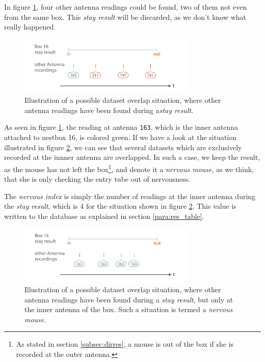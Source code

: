In figure \ref{fig:dataset_overlap}, four other antenna readings could be found, two of them not even from the same box. This \textit{stay result} will be discarded, as we don't know what really happened.

\begin{figure}[htpb]
\begin{center}
  \includegraphics[width=0.75\textwidth]{assets/pdf/dataset_overlap_schema.pdf}
  \caption[Dataset overlap situation]{Illustration of a possible dataset overlap situation, where other antenna readings have been found during a\textit{stay result}.}
  \label{fig:dataset_overlap}
\end{center}
\end{figure}

As seen in figure \ref{fig:dataset_overlap}, the reading at antenna \lstinline|163|, which is the inner antenna attached to nestbox 16, is colored green. If we have a look at the situation illustrated in figure \ref{fig:dataset_overlap_nervous}, we can see that several datasets which are exclusively recorded at the innner antenna are overlapped. In such a case, we keep the result, as the  mouse has not left the box\footnote{As stated in section \ref{subsec:dirres}, a mouse is out of the box if she is recorded at the outer antenna.}, and denote it a \textit{nervous mouse}, as we think, that she is only checking the entry tube out of nervousness.

The \textit{nervous index} is simply the number of readings at the inner antenna during the \textit{stay result}, which is 4 for the situation shown in figure \ref{fig:dataset_overlap_nervous}. This value is written to the database as explained in section \ref{para:res_table}.

\begin{figure}[htpb]
\begin{center}
  \includegraphics[width=0.75\textwidth]{assets/pdf/dataset_overlap_nervous_schema.pdf}
  \caption[Dataset overlap situation for a \textit{nervous mouse}]{Illustration of a possible dataset overlap situation, where other antenna readings have been found during a \textit{stay result}, but only at the inner antenna of the box. Such a situation is termed a \textit{nervous mouse}.}
  \label{fig:dataset_overlap_nervous}
\end{center}
\end{figure}

